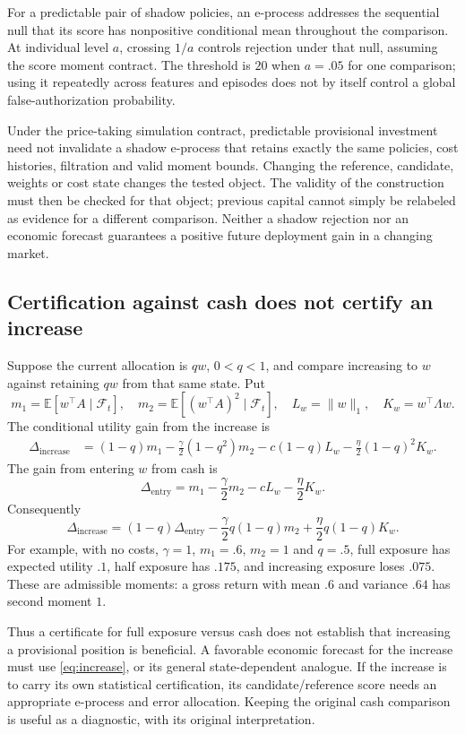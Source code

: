 \documentclass[11pt,a4paper]{article}
\newcommand{\E}{\mathbb E}
\newcommand{\F}{\mathcal F}
\begin{document}
For a predictable pair of shadow policies, an e-process addresses the
sequential null that its score has nonpositive conditional mean throughout
the comparison. At individual level $a$, crossing $1/a$ controls rejection
under that null, assuming the score moment contract. The threshold is $20$
when $a=.05$ for one comparison; using it repeatedly across features and
episodes does not by itself control a global false-authorization probability.

Under the price-taking simulation contract, predictable provisional
investment need not invalidate a shadow e-process that retains exactly the
same policies, cost histories, filtration and valid moment bounds.
Changing the reference, candidate, weights or cost state changes the tested
object. The validity of the construction must then be checked for that
object; previous capital cannot simply be relabeled as evidence for a
different comparison. Neither a shadow rejection nor an economic forecast
guarantees a positive future deployment gain in a changing market.

\subsection*{Certification against cash does not certify an increase}
Suppose the current allocation is $qw$, $0<q<1$, and compare increasing to
$w$ against retaining $qw$ from that same state. Put
\[
 m_1=\E[w^\top A\mid\F_t],\quad
 m_2=\E[(w^\top A)^2\mid\F_t],\quad
 L_w=\|w\|_1,\quad K_w=w^\top\Lambda w.
\]
The conditional utility gain from the increase is
\begin{align}
 \Delta_{\mathrm{increase}}
 &=(1-q)m_1-\frac{\gamma}{2}(1-q^2)m_2
       -c(1-q)L_w-\frac{\eta}{2}(1-q)^2K_w. \label{eq:increase}
\end{align}
The gain from entering $w$ from cash is
\[
 \Delta_{\mathrm{entry}}
 =m_1-\frac{\gamma}{2}m_2-cL_w-\frac{\eta}{2}K_w.
\]
Consequently
\[
 \Delta_{\mathrm{increase}}
 =(1-q)\Delta_{\mathrm{entry}}
   -\frac{\gamma}{2}q(1-q)m_2
   +\frac{\eta}{2}q(1-q)K_w.
\]
For example, with no costs, $\gamma=1$, $m_1=.6$, $m_2=1$ and $q=.5$,
full exposure has expected utility $.1$, half exposure has $.175$, and
increasing exposure loses $.075$. These are admissible moments: a gross
return with mean $.6$ and variance $.64$ has second moment $1$.

Thus a certificate for full exposure versus cash does not establish that
increasing a provisional position is beneficial. A favorable economic
forecast for the increase must use \eqref{eq:increase}, or its general
state-dependent analogue. If the increase is to carry its own statistical
certification, its candidate/reference score needs an appropriate e-process
and error allocation. Keeping the original cash comparison is useful as
a diagnostic, with its original interpretation.
\end{document}
